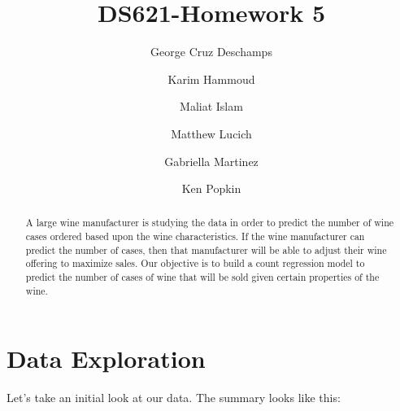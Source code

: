 \documentclass[]{elsarticle} %
\begin{document}
\begin{frontmatter}

  \title{DS621-Homework 5}
    \author[Critical Thinking Group 2 - DS621]{George Cruz Deschamps}
    \author[Critical Thinking Group 2 - DS621]{Karim Hammoud}
    \author[Critical Thinking Group 2 - DS621]{Maliat Islam}
    \author[Critical Thinking Group 2 - DS621]{Matthew Lucich}
    \author[Critical Thinking Group 2 - DS621]{Gabriella Martinez}
    \author[Critical Thinking Group 2 - DS621]{Ken Popkin}
      
  \begin{abstract}
  A large wine manufacturer is studying the data in order to predict the
  number of wine cases ordered based upon the wine characteristics. If the
  wine manufacturer can predict the number of cases, then that
  manufacturer will be able to adjust their wine offering to maximize
  sales. Our objective is to build a count regression model to predict the
  number of cases of wine that will be sold given certain properties of
  the wine.
  \end{abstract}
  
 \end{frontmatter}

\newpage

\hypertarget{data-exploration}{%
\section{Data Exploration}\label{data-exploration}}

Let's take an initial look at our data. The summary looks like this:
\end{document}
